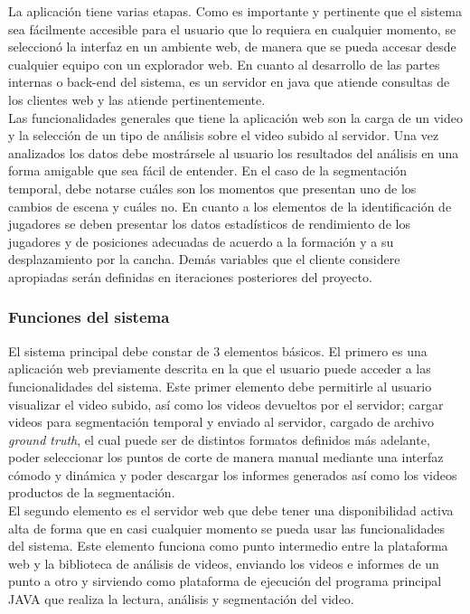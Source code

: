 \documentclass[a4paper]{article}
\newcommand\tab[1][0.55cm]{\hspace*{#1}}
\begin{document}
{	\tab La aplicación tiene varias etapas. Como es importante y pertinente que el sistema sea fácilmente accesible para el usuario que lo requiera en cualquier momento, se seleccionó la interfaz en un ambiente web, de manera que se pueda accesar desde cualquier equipo con un explorador web. En cuanto al desarrollo de las partes internas o back-end del sistema, es un servidor en java que atiende consultas de los clientes web y las atiende pertinentemente. \\
    
    Las funcionalidades generales que tiene la aplicación web son la carga de un video y la selección de un tipo de análisis sobre el video subido al servidor. Una vez analizados los datos debe mostrársele al usuario los resultados del análisis en una forma amigable que sea fácil de entender. En el caso de la segmentación temporal, debe notarse cuáles son los momentos que presentan uno de los cambios de escena y cuáles no. En cuanto a los elementos de la identificación de jugadores se deben presentar los datos estadísticos de rendimiento de los jugadores y de posiciones adecuadas de acuerdo a la formación y a su desplazamiento por la cancha. Demás variables que el cliente considere apropiadas serán definidas en iteraciones posteriores del proyecto. 


\color{Blue}
\subsubsection{Funciones del sistema}
\color{black}
\justify 

	\tab El sistema principal debe constar de 3 elementos básicos. El primero es una aplicación web previamente descrita en la que el usuario puede acceder a las funcionalidades del sistema. Este primer elemento debe permitirle al usuario visualizar el video subido, así como los videos devueltos por el servidor; cargar videos para segmentación temporal y enviado al servidor, cargado de archivo \textit{ground truth}, el cual puede ser de distintos formatos definidos más adelante, poder seleccionar los puntos de corte de manera manual mediante una interfaz cómodo y dinámica y poder descargar los informes generados así como los videos productos de la segmentación. \\ 
    
    El segundo elemento es el servidor web que debe tener una disponibilidad activa alta de forma que en casi cualquier momento se pueda usar las funcionalidades del sistema. Este elemento funciona como punto intermedio entre la plataforma web y la biblioteca de análisis de videos, enviando los videos e informes de un punto a otro y sirviendo como plataforma de ejecución del programa principal JAVA que realiza la lectura, análisis y segmentación del video. \\ 
    
}
\end{document}
